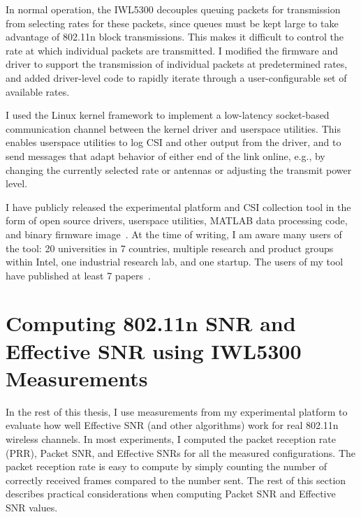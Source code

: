  In normal operation, the IWL5300 decouples queuing packets for transmission from selecting rates for these packets, since queues must be kept large to take advantage of 802.11n block transmissions. This makes it difficult to control the rate at which individual packets are transmitted. I modified the firmware and driver to support the transmission of individual packets at predetermined rates, and added driver-level code to rapidly iterate through a user-configurable set of available rates.

 I used the Linux kernel  framework to implement a low-latency socket-based communication channel between the kernel driver and userspace utilities. This enables userspace utilities to log CSI and other output from the driver, and to send messages that adapt behavior of either end of the link online, e.g., by changing the currently selected rate or antennas or adjusting the transmit power level.

 I have publicly released the experimental platform and CSI collection tool in the form of open source drivers, userspace utilities, MATLAB data processing code, and binary firmware image~\cite{Halperin_csitool}. At the time of writing, I am aware many users of the tool: 20 universities in 7 countries, multiple research and product groups within Intel, one industrial research lab, and one startup. The users of my tool have published at least 7 papers~\cite{Bhartia_FreqDiv,Crepaldi_CSI_SF,Gong_MuMIMO,Perahia_Doppler,Sen_SpinLoc,Sen_PinLoc,Wu_FILA}.

\section{Computing 802.11n SNR and Effective SNR using IWL5300 Measurements}
In the rest of this thesis, I use measurements from my experimental platform to evaluate how well Effective SNR (and other algorithms) work for real 802.11n wireless channels. In most experiments, I computed the packet reception rate (PRR), Packet SNR, and Effective SNRs for all the measured configurations. The packet reception rate is easy to compute by simply counting the number of correctly received frames compared to the number sent. The rest of this section describes practical considerations when computing Packet SNR and Effective SNR values.

